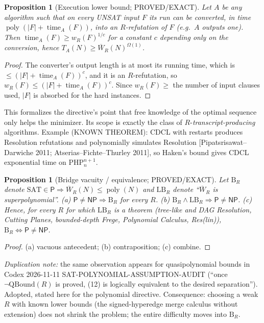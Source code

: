 \documentclass[11pt]{article}
\newtheorem{proposition}[theorem]{Proposition}
\newcommand{\SAT}{\mathrm{SAT}}
\newcommand{\Pc}{\mathsf P}
\newcommand{\NP}{\mathsf{NP}}
\newcommand{\poly}{\operatorname{poly}}
\newcommand{\WR}{\overline W_R}
\begin{document}
\begin{proposition}[Execution lower bound; PROVED/EXACT]\label{p:exec}
Let $A$ be any algorithm such that on every UNSAT input $F$ its run can be
converted, in time $\poly(|F|+\operatorname{time}_A(F))$, into an
$R$-refutation of $F$ (e.g.\ $A$ outputs one). Then
$\operatorname{time}_A(F)\ge w_R(F)^{1/c}$ for a constant $c$ depending only
on the conversion, hence $T_A(N)\ge\WR(N)^{\Omega(1)}$.
\end{proposition}
\begin{proof}
The converter's output length is at most its running time, which is
$\le(|F|+\operatorname{time}_A(F))^{c}$, and it is an $R$-refutation, so
$w_R(F)\le(|F|+\operatorname{time}_A(F))^{c}$. Since $w_R(F)\ge$ the number of
input clauses used, $|F|$ is absorbed for the hard instances.
\end{proof}
This formalizes the directive's point that free knowledge of the optimal
sequence only helps the minimizer. Its scope is exactly the class of
$R$-\emph{transcript-producing} algorithms. Example (KNOWN THEOREM):
CDCL with restarts produces Resolution refutations and polynomially
simulates Resolution [Pipatsrisawat--Darwiche 2011; Atserias--Fichte--Thurley
2011], so Haken's bound gives CDCL exponential time on $\mathrm{PHP}^{n+1}_n$.

\begin{proposition}[Bridge vacuity / equivalence; PROVED/EXACT]\label{p:vac}
Let $\mathrm{B}_R$ denote $\SAT\in\Pc\Rightarrow\WR(N)\le\poly(N)$ and
$\mathrm{LB}_R$ denote ``$\WR$ is superpolynomial''.
(a) $\Pc\ne\NP\Rightarrow\mathrm B_R$ for every $R$.
(b) $\mathrm B_R\wedge\mathrm{LB}_R\Rightarrow\Pc\ne\NP$.
(c) Hence, for every $R$ for which $\mathrm{LB}_R$ is a theorem
(tree-like and DAG Resolution, Cutting Planes, bounded-depth Frege,
Polynomial Calculus, Res(lin)), $\mathrm B_R\Leftrightarrow\Pc\ne\NP$.
\end{proposition}
\begin{proof}
(a) vacuous antecedent; (b) contraposition; (c) combine.
\end{proof}
\emph{Duplication note:} the same observation appears for quasipolynomial
bounds in Codex 2026-11-11 SAT-POLYNOMIAL-ASSUMPTION-AUDIT (``once
$\neg\mathrm{QBound}(R)$ is proved, (12) is logically equivalent to the
desired separation''). Adopted, stated here for the polynomial directive.
Consequence: choosing a weak $R$ with known lower bounds (the signed-hyperedge
merge calculus without extension) does not shrink the problem; the entire
difficulty moves into $\mathrm B_R$.
\end{document}
